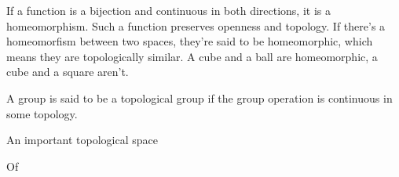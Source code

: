 \documentclass[11pt,oneside,%
]{memoir}
\theoremstyle{definition}
\begin{document}
If a function is a bijection and continuous in both directions, it is a homeomorphism. Such a function preserves openness and topology. If there's a homeomorfism between two spaces, they're said to be homeomorphic, which means they are topologically similar. A cube and a ball are homeomorphic, a cube and a square aren't.


A group is said to be a topological group if the group operation is continuous in some topology.

An important topological space


Of


\end{document}
